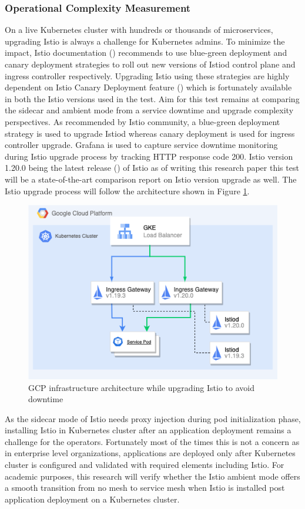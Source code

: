\subsubsection{Operational Complexity Measurement}
On a live Kubernetes cluster with hundreds or thousands of microservices, upgrading Istio is always a challenge for Kubernetes admins. To minimize the impact, Istio documentation (\cite{istioDocCanaryUpgrade}) recommends to use blue-green deployment and canary deployment strategies to roll out new versions of Istiod control plane and ingress controller respectively. Upgrading Istio using these strategies are highly dependent on Istio Canary Deployment feature (\cite{istioDocHelm}) which is fortunately available in both the Istio versions used in the test. Aim for this test remains at comparing the sidecar and ambient mode from a service downtime and upgrade complexity perspectives. As recommended by Istio community, a blue-green deployment strategy is used to upgrade Istiod whereas canary deployment is used for ingress controller upgrade. Grafana is used to capture service downtime monitoring during Istio upgrade process by tracking HTTP response code 200. Istio version 1.20.0 being the latest release (\cite{istioNewsVersion}) of Istio as of writing this research paper this test will be a state-of-the-art comparison report on Istio version upgrade as well. The Istio upgrade process will follow the architecture shown in Figure \ref{method:istioUpgradeArch}.

\begin{figure}[ht!]
    \centering
    \includegraphics[width=0.7\linewidth]{resources/istio-upgrade-strategy.drawio.png}
    \caption{GCP infrastructure architecture while upgrading Istio to avoid downtime}
    \label{method:istioUpgradeArch}
\end{figure}

As the sidecar mode of Istio needs proxy injection during pod initialization phase, installing Istio in Kubernetes cluster after an application deployment remains a challenge for the operators. Fortunately most of the times this is not a concern as in enterprise level organizations, applications are deployed only after Kubernetes cluster is configured and validated with required elements including Istio. For academic purposes, this research will verify whether the Istio ambient mode offers a smooth transition from no mesh to service mesh when Istio is installed post application deployment on a Kubernetes cluster.


